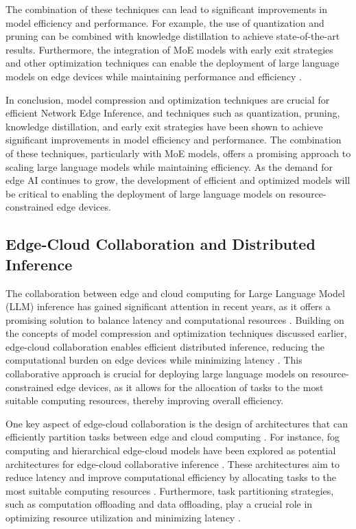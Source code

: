 \documentclass[11pt,a4paper]{article}
\begin{document}
The combination of these techniques can lead to significant improvements in model efficiency and performance. For example, the use of quantization and pruning can be combined with knowledge distillation to achieve state-of-the-art results. Furthermore, the integration of MoE models with early exit strategies and other optimization techniques can enable the deployment of large language models on edge devices while maintaining performance and efficiency \cite{arxiv:2410.12247}. 

In conclusion, model compression and optimization techniques are crucial for efficient Network Edge Inference, and techniques such as quantization, pruning, knowledge distillation, and early exit strategies have been shown to achieve significant improvements in model efficiency and performance. The combination of these techniques, particularly with MoE models, offers a promising approach to scaling large language models while maintaining efficiency. As the demand for edge AI continues to grow, the development of efficient and optimized models will be critical to enabling the deployment of large language models on resource-constrained edge devices.


\subsection{Edge-Cloud Collaboration and Distributed Inference}


The collaboration between edge and cloud computing for Large Language Model (LLM) inference has gained significant attention in recent years, as it offers a promising solution to balance latency and computational resources \cite{doi:10.1109/twc.2022.3165824}. Building on the concepts of model compression and optimization techniques discussed earlier, edge-cloud collaboration enables efficient distributed inference, reducing the computational burden on edge devices while minimizing latency \cite{doi:10.3390/electronics12173598}. This collaborative approach is crucial for deploying large language models on resource-constrained edge devices, as it allows for the allocation of tasks to the most suitable computing resources, thereby improving overall efficiency.

One key aspect of edge-cloud collaboration is the design of architectures that can efficiently partition tasks between edge and cloud computing \cite{arxiv:2406.02290}. For instance, fog computing and hierarchical edge-cloud models have been explored as potential architectures for edge-cloud collaborative inference \cite{arxiv:2405.12532}. These architectures aim to reduce latency and improve computational efficiency by allocating tasks to the most suitable computing resources \cite{doi:10.1109/access.2024.3409745}. Furthermore, task partitioning strategies, such as computation offloading and data offloading, play a crucial role in optimizing resource utilization and minimizing latency \cite{doi:10.1109/ojcoms.2023.3280174}.
\end{document}
